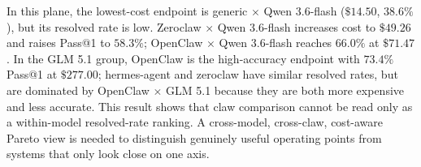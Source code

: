 \documentclass{llmxive}
\providecommand{\arraystretch}{1.0}
\begin{document}
In this plane, the lowest-cost endpoint is generic $\times$ Qwen 3.6-flash ($\$14.50$, $38.6\%$), but its resolved rate is low. Zeroclaw $\times$ Qwen 3.6-flash increases cost to $\$49.26$ and raises Pass@1 to $58.3\%$; OpenClaw $\times$ Qwen 3.6-flash reaches $66.0\%$ at $\$71.47$. In the GLM 5.1 group, OpenClaw is the high-accuracy endpoint with $73.4\%$ Pass@1 at $\$277.00$; hermes-agent and zeroclaw have similar resolved rates, but are dominated by OpenClaw $\times$ GLM 5.1 because they are both more expensive and less accurate. This result shows that claw comparison cannot be read only as a within-model resolved-rate ranking. A cross-model, cross-claw, cost-aware Pareto view is needed to distinguish genuinely useful operating points from systems that only look close on one axis.




\end{document}
